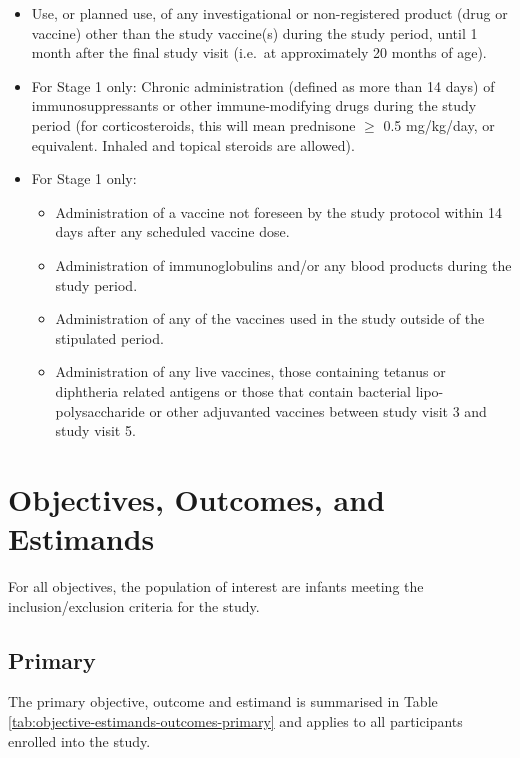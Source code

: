 \documentclass{bmcart}
\begin{document}
\begin{itemize}
	\item Use, or planned use, of any investigational or non-registered product (drug or vaccine) other than the study vaccine(s) during the study period, until 1 month after the final study visit (i.e.~at approximately 20 months of age).
	\item For Stage 1 only: Chronic administration (defined as more than 14 days) of immunosuppressants or other immune-modifying drugs during the study period (for corticosteroids, this will mean prednisone $\geq$ 0.5 mg/kg/day, or equivalent. Inhaled and topical steroids are allowed).
	\item For Stage 1 only:
	
	\begin{itemize}
		\item Administration of a vaccine not foreseen by the study protocol within 14 days after any scheduled vaccine dose.
		\item Administration of immunoglobulins and/or any blood products during the study period.
		\item Administration of any of the vaccines used in the study outside of the stipulated period.
		\item Administration of any live vaccines, those containing tetanus or diphtheria related antigens or those that contain bacterial lipo-polysaccharide or other adjuvanted vaccines between study visit 3 and study visit 5.
	\end{itemize}
\end{itemize}

\section*{Objectives, Outcomes, and Estimands}

For all objectives, the population of interest are infants meeting the inclusion/exclusion criteria for the study.

\subsection*{Primary}

The primary objective, outcome and estimand is summarised in Table \ref{tab:objective-estimands-outcomes-primary} and applies to all participants enrolled into the study.
\end{document}
